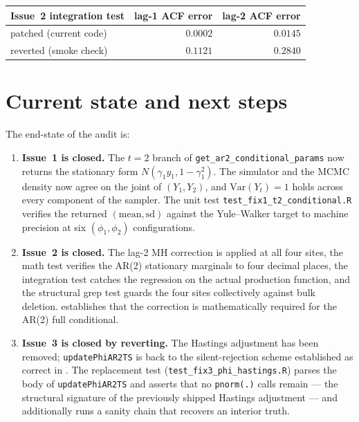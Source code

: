 \documentclass[11pt]{article}
\theoremstyle{plain}
\theoremstyle{definition}
\theoremstyle{remark}
\begin{document}
\begin{center}
\begin{tabular}{lrr}
\toprule
\textbf{Issue~2 integration test} & lag-1 ACF error & lag-2 ACF error \\
\midrule
patched (current code)            & $0.0002$         & $0.0145$         \\
reverted (smoke check)            & $0.1121$         & $0.2840$         \\
\bottomrule
\end{tabular}
\end{center}

\section{Current state and next steps}\label{sec:state}

The end-state of the audit is:
\begin{enumerate}
  \item \textbf{Issue~1 is closed.} The $t = 2$ branch of
        \texttt{get\_ar2\_conditional\_params} now returns the stationary
        form $N(\gamma_1 y_1, 1 - \gamma_1^2)$. The simulator and the MCMC
        density now agree on the joint of $(Y_1, Y_2)$, and
        $\mathrm{Var}(Y_t) = 1$ holds across every component of the
        sampler. The unit test \texttt{test\_fix1\_t2\_conditional.R}
        verifies the returned $(\mathrm{mean}, \mathrm{sd})$ against the
        Yule--Walker target to machine precision at six $(\phi_1, \phi_2)$
        configurations.

  \item \textbf{Issue~2 is closed.} The lag-2 MH correction is applied at
        all four sites, the math test verifies the AR(2) stationary
        marginals to four decimal places, the integration test catches
        the regression on the actual production function, and the
        structural grep test guards the four sites collectively against
        bulk deletion.  establishes that the correction
        is mathematically required for the AR(2) full conditional.

  \item \textbf{Issue~3 is closed by reverting.} The Hastings adjustment
        has been removed; \texttt{updatePhiAR2TS} is back to the
        silent-rejection scheme established as correct in
        . The replacement test
        (\texttt{test\_fix3\_phi\_hastings.R}) parses the body of
        \texttt{updatePhiAR2TS} and asserts that no \texttt{pnorm(.)}
        calls remain --- the structural signature of the previously
        shipped Hastings adjustment --- and additionally runs a sanity
        chain that recovers an interior truth.
\end{enumerate}
\end{document}
